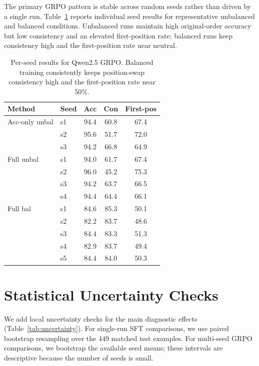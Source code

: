 \documentclass[letterpaper]{article}
\newcommand{\multirow}[3]{#3}
\begin{document}
The primary GRPO pattern is stable across random seeds rather than driven by a single run. Table~\ref{tab:seeds} reports individual seed results for representative unbalanced and balanced conditions. Unbalanced runs maintain high original-order accuracy but low consistency and an elevated first-position rate; balanced runs keep consistency high and the first-position rate near neutral.

\begin{table}[H]
\centering
\scriptsize
\begin{tabular}{llccc}
\toprule
\textbf{Method} & \textbf{Seed} & \textbf{Acc} & \textbf{Con} & \textbf{First-pos} \\
\midrule
\multirow{3}{*}{Acc-only unbal} & s1 & 94.4 & 60.8 & 67.4 \\
 & s2 & 95.6 & 51.7 & 72.0 \\
 & s3 & 94.2 & 66.8 & 64.9 \\
\midrule
\multirow{4}{*}{Full unbal} & s1 & 94.0 & 61.7 & 67.4 \\
 & s2 & 96.0 & 45.2 & 75.3 \\
 & s3 & 94.2 & 63.7 & 66.5 \\
 & s4 & 94.4 & 64.4 & 66.1 \\
\midrule
\multirow{5}{*}{Full bal} & s1 & 84.6 & 85.3 & 50.1 \\
 & s2 & 82.2 & 83.7 & 48.6 \\
 & s3 & 84.4 & 83.3 & 51.3 \\
 & s4 & 82.9 & 83.7 & 49.4 \\
 & s5 & 84.4 & 84.0 & 50.3 \\
\bottomrule
\end{tabular}
\caption{Per-seed results for Qwen2.5 GRPO. Balanced training consistently keeps position-swap consistency high and the first-position rate near 50\%.}
\label{tab:seeds}
\end{table}

\section{Statistical Uncertainty Checks}
\label{app:uncertainty}

We add local uncertainty checks for the main diagnostic effects (Table~\ref{tab:uncertainty}). For single-run SFT comparisons, we use paired bootstrap resampling over the 449 matched test examples. For multi-seed GRPO comparisons, we bootstrap the available seed means; these intervals are descriptive because the number of seeds is small.
\end{document}
